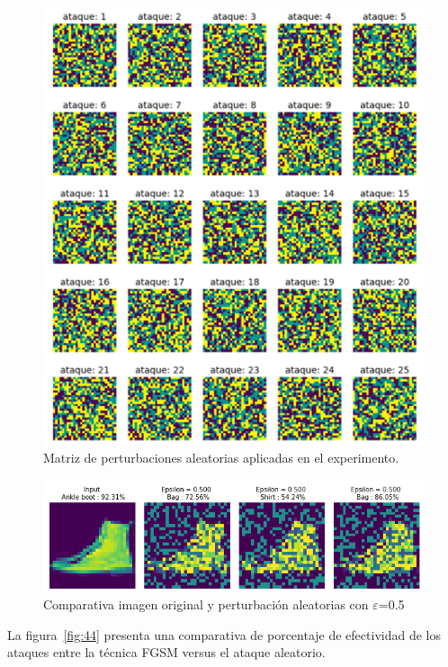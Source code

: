 \begin{figure}[!h]
\centering
\includegraphics[scale = 1]{Figures/figura_42.PNG}
\decoRule
\caption[Matriz perturbaciones aleatorias aplicadas en el experimento con MNIST.]{Matriz de perturbaciones aleatorias aplicadas en el experimento.}
\label{fig:42}
\end{figure}

\begin{figure}[!h]
\centering
\includegraphics[scale = 0.85]{Figures/figura_43.PNG}
\decoRule
\caption[Matriz perturbaciones aleatorias aplicadas en el experimento con MNIST.]{Comparativa imagen original y perturbación aleatorias con $\varepsilon$=0.5}
\label{fig:43}
\end{figure}

La figura~\ref{fig:44} presenta una comparativa de porcentaje de efectividad de los ataques entre la técnica FGSM versus el ataque aleatorio.

